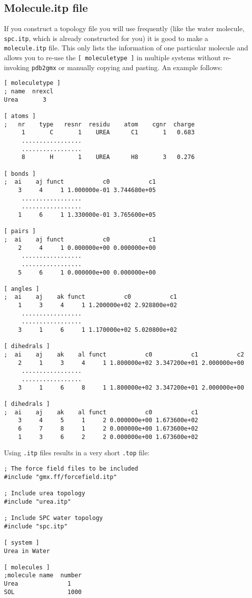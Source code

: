 \subsection{Molecule.itp file}
\label{subsec:molitp}
If you construct a topology file you will use frequently (like the water
molecule, {\tt spc.itp}, which is already constructed for you) it is
good to make a {\tt molecule.itp} file. This only lists the
information of one particular molecule and allows you to re-use the
{\tt [ moleculetype ]} in multiple systems without re-invoking
{\tt pdb2gmx} or manually copying and pasting. An example follows: 

{\small
\begin{verbatim}
[ moleculetype ]
; name  nrexcl
Urea       3

[ atoms ]
;   nr    type   resnr  residu    atom    cgnr  charge
     1       C       1    UREA      C1       1   0.683  
     .................
     .................
     8       H       1    UREA      H8       3   0.276

[ bonds ]
;  ai    aj funct           c0           c1
    3     4     1 1.000000e-01 3.744680e+05 
     .................
     .................
    1     6     1 1.330000e-01 3.765600e+05 

[ pairs ]
;  ai    aj funct           c0           c1
    2     4     1 0.000000e+00 0.000000e+00 
     .................
     .................
    5     6     1 0.000000e+00 0.000000e+00 

[ angles ]
;  ai    aj    ak funct           c0           c1
    1     3     4     1 1.200000e+02 2.928800e+02 
     .................
     .................
    3     1     6     1 1.170000e+02 5.020800e+02 

[ dihedrals ]
;  ai    aj    ak    al funct           c0           c1           c2
    2     1     3     4     1 1.800000e+02 3.347200e+01 2.000000e+00 
     .................
     .................
    3     1     6     8     1 1.800000e+02 3.347200e+01 2.000000e+00 

[ dihedrals ]
;  ai    aj    ak    al funct           c0           c1
    3     4     5     1     2 0.000000e+00 1.673600e+02 
    6     7     8     1     2 0.000000e+00 1.673600e+02 
    1     3     6     2     2 0.000000e+00 1.673600e+02 
\end{verbatim}}

Using {\tt *.itp} files results in a very short {\tt *.top} file:

{\small
\begin{verbatim}
; The force field files to be included
#include "gmx.ff/forcefield.itp"
        
; Include urea topology
#include "urea.itp"

; Include SPC water topology
#include "spc.itp"

[ system ]
Urea in Water

[ molecules ]
;molecule name  number
Urea              1
SOL               1000
\end{verbatim}}


